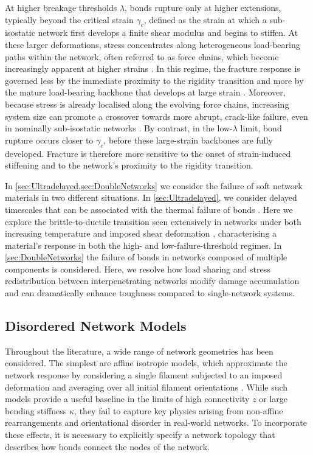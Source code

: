At higher breakage thresholds $\lambda$, bonds rupture only at higher extensions, typically beyond the critical strain $\gamma_c$, defined as the strain at which a sub-isostatic network first develops a finite shear modulus and begins to stiffen. At these larger deformations, stress concentrates along heterogeneous load-bearing paths within the network, often referred to as force chains, which become increasingly apparent at higher strains \cite{ruiz-franco_force_2022,Heussinger2007}. In this regime, the fracture response is governed less by the immediate proximity to the rigidity transition and more by the mature load-bearing backbone that develops at large strain \cite{Sarkar2022}. Moreover, because stress is already localised along the evolving force chains, increasing system size can promote a crossover towards more abrupt, crack-like failure, even in nominally sub-isostatic networks \cite{zhang_fiber_2017,driscollRoleRigidityControlling2016,dussi_athermal_2020,tauber_stretchy_2022}. By contrast, in the low-$\lambda$ limit, bond rupture occurs closer to $\gamma_c$, before these large-strain backbones are fully developed. Fracture is therefore more sensitive to the onset of strain-induced stiffening and to the network's proximity to the rigidity transition. 

In \cref{sec:Ultradelayed,sec:DoubleNetworks} we consider the failure of soft network materials in two different situations. In \cref{sec:Ultradelayed}, we consider delayed timescales that can be associated with the thermal failure of bonds \cite{tauber_role_2020,Bullerjahn2014,arruda_three-dimensional_1993,james_theory_1943,Skrzeszewska2010}. Here we explore the brittle-to-ductile transition seen extensively in networks under both increasing temperature and imposed shear deformation \cite{dussi_athermal_2020,ahmedBrittleDuctileTransition2014,ducrot_toughening_2014,tauber_role_2020}, characterising a material's response in both the high- and low-failure-threshold regimes. In \cref{sec:DoubleNetworks} the failure of bonds in networks composed of multiple components is considered. Here, we resolve how load sharing and stress redistribution between interpenetrating networks modify damage accumulation and can dramatically enhance toughness compared to single-network systems.

\subsection{Disordered Network Models} \label{sec:NetworkStructure}
Throughout the literature, a wide range of network geometries has been considered. The simplest are affine isotropic models, which approximate the network response by considering a single filament subjected to an imposed deformation and averaging over all initial filament orientations \cite{mackintosh_elasticity_1995, storm_nonlinear_2005}. While such models provide a useful baseline in the limits of high connectivity $z$ or large bending stiffness $\kappa$, they fail to capture key physics arising from non-affine rearrangements and orientational disorder in real-world networks. To incorporate these effects, it is necessary to explicitly specify a network topology that describes how bonds connect the nodes of the network. 

